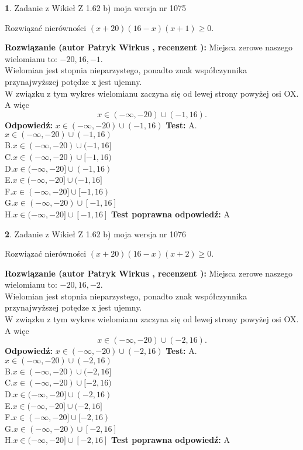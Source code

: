 \documentclass[12pt, a4paper]{article}
\theoremstyle{definition} %
\newtheorem{zad}{}
\newcommand{\zadStart}[1]{\begin{zad}#1\newline}
\newcommand{\zadStop}{\end{zad}}
\newcommand{\rozwStart}[2]{\noindent \textbf{Rozwiązanie (autor #1 , recenzent #2): }\newline}
\newcommand{\rozwStop}{\newline}
\newcommand{\odpStart}{\noindent \textbf{Odpowiedź:}\newline}
\newcommand{\odpStop}{\newline}
\newcommand{\testStart}{\noindent \textbf{Test:}\newline}
\newcommand{\testStop}{\newline}
\newcommand{\kluczStart}{\noindent \textbf{Test poprawna odpowiedź:}\newline}
\newcommand{\kluczStop}{\newline}
\begin{document}
\zadStart{Zadanie z Wikieł Z 1.62 b) moja wersja nr 1075}

Rozwiązać nierówności $(x+20)(16-x)(x+1)\ge0$.
\zadStop
\rozwStart{Patryk Wirkus}{}
Miejsca zerowe naszego wielomianu to: $-20, 16, -1$.\\
Wielomian jest stopnia nieparzystego, ponadto znak współczynnika przy\linebreak najwyższej potędze x jest ujemny.\\ W związku z tym wykres wielomianu zaczyna się od lewej strony powyżej osi OX. A więc $$x \in (-\infty,-20) \cup (-1,16).$$
\rozwStop
\odpStart
$x \in (-\infty,-20) \cup (-1,16)$
\odpStop
\testStart
A.$x \in (-\infty,-20) \cup (-1,16)$\\
B.$x \in (-\infty,-20) \cup (-1,16]$\\
C.$x \in (-\infty,-20) \cup [-1,16)$\\
D.$x \in (-\infty,-20] \cup (-1,16)$\\
E.$x \in (-\infty,-20] \cup (-1,16]$\\
F.$x \in (-\infty,-20] \cup [-1,16)$\\
G.$x \in (-\infty,-20) \cup [-1,16]$\\
H.$x \in (-\infty,-20] \cup [-1,16]$
\testStop
\kluczStart
A
\kluczStop



\zadStart{Zadanie z Wikieł Z 1.62 b) moja wersja nr 1076}

Rozwiązać nierówności $(x+20)(16-x)(x+2)\ge0$.
\zadStop
\rozwStart{Patryk Wirkus}{}
Miejsca zerowe naszego wielomianu to: $-20, 16, -2$.\\
Wielomian jest stopnia nieparzystego, ponadto znak współczynnika przy\linebreak najwyższej potędze x jest ujemny.\\ W związku z tym wykres wielomianu zaczyna się od lewej strony powyżej osi OX. A więc $$x \in (-\infty,-20) \cup (-2,16).$$
\rozwStop
\odpStart
$x \in (-\infty,-20) \cup (-2,16)$
\odpStop
\testStart
A.$x \in (-\infty,-20) \cup (-2,16)$\\
B.$x \in (-\infty,-20) \cup (-2,16]$\\
C.$x \in (-\infty,-20) \cup [-2,16)$\\
D.$x \in (-\infty,-20] \cup (-2,16)$\\
E.$x \in (-\infty,-20] \cup (-2,16]$\\
F.$x \in (-\infty,-20] \cup [-2,16)$\\
G.$x \in (-\infty,-20) \cup [-2,16]$\\
H.$x \in (-\infty,-20] \cup [-2,16]$
\testStop
\kluczStart
A
\kluczStop
\end{document}
